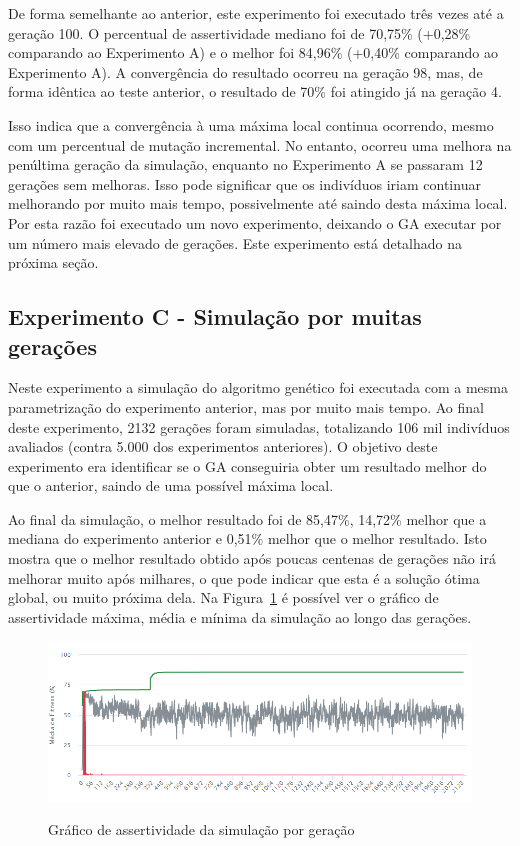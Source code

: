 \documentclass[12pt,oneside,a4paper,english,french,spanish,brazil,]{abntex2}
\begin{document}
De forma semelhante ao anterior, este experimento foi executado três vezes até a geração 100. O percentual de assertividade mediano foi de 70,75\% (+0,28\% comparando ao Experimento A) e o melhor foi 84,96\% (+0,40\% comparando ao Experimento A). A convergência do resultado ocorreu na geração 98, mas, de forma idêntica ao teste anterior, o resultado de 70\% foi atingido já na geração 4. 

Isso indica que a convergência à uma máxima local continua ocorrendo, mesmo com um percentual de mutação incremental. No entanto, ocorreu uma melhora na penúltima geração da simulação, enquanto no Experimento A se passaram 12 gerações sem melhoras. Isso pode significar que os indivíduos iriam continuar melhorando por muito mais tempo, possivelmente até saindo desta máxima local. Por esta razão foi executado um novo experimento, deixando o GA executar por um número mais elevado de gerações. Este experimento está detalhado na próxima seção.


\subsection{Experimento C - Simulação por muitas gerações}

Neste experimento a simulação do algoritmo genético foi executada com a mesma parametrização do experimento anterior, mas por muito mais tempo. Ao final deste experimento, 2132 gerações foram simuladas, totalizando 106 mil indivíduos avaliados (contra 5.000 dos experimentos anteriores). O objetivo deste experimento era identificar se o GA conseguiria obter um resultado melhor do que o anterior, saindo de uma possível máxima local.

Ao final da simulação, o melhor resultado foi de 85,47\%, 14,72\% melhor que a mediana do experimento anterior e 0,51\% melhor que o melhor resultado. Isto mostra que o melhor resultado obtido após poucas centenas de gerações não irá melhorar muito após milhares, o que pode indicar que esta é a solução ótima global, ou muito próxima dela. Na Figura~\ref{fig:DES_Grafico_Experimento_C} é possível ver o gráfico de assertividade máxima, média e mínima da simulação ao longo das gerações.


\begin{figure}[ht]
\centering
\caption{Gráfico de assertividade da simulação por geração}
\includegraphics[width=1.0\textwidth]{imagens/DES_Grafico_Experimento_C.PNG}
\sourceAuthor{}
\label{fig:DES_Grafico_Experimento_C}
\end{figure}
\end{document}
